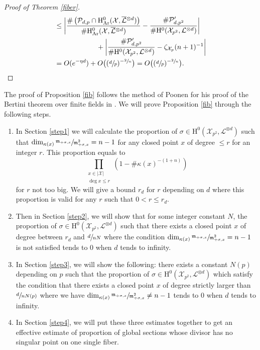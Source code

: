 \documentclass[JEP,XML,SOM,Unicode,published]{cedram}
\theoremstyle{plain}
\theoremstyle{definition}
\newcommand{\ho}{\mathrm{H}}
\newcommand{\m}{\mathfrak{m}}
\newcommand{\X}{\mathcal{X}}
\newcommand{\Li}{\overline{\mathcal{L}}{}}
\newcommand{\li}{\mathcal{L}}
\begin{document}
\begin{proof}[Proof of Theorem \ref{fiber}]
\begin{align*}
&\leq \biggl| \frac{\#\left(\mathcal{P}_{d,p}\cap \ho^0_{\mathrm{Ar}}(\X, \Li^{\otimes d})\right)}{\#\ho^0_{\mathrm{Ar}}(\X, \Li^{\otimes d})} -\frac{\#\mathcal{P}'_{d,p^2} }{\#\ho^0(\X_{p^2}, \li^{\otimes d})} \biggr|\\
&\hspace*{2.1cm}+\biggl| \frac{\#\mathcal{P}'_{d,p^2}}{\#\ho^0(\X_{p^2}, \li^{\otimes d})} -\zeta_{\X_p}(n+1)^{-1} \biggr| \\
&=O(e^{-\eta d})+O\bigl((\sfrac{d}{p})^{-\sfrac{2}{n}} \bigr)=O\bigl((\sfrac{d}{p})^{-\sfrac{2}{n}} \bigr).\qedhere
\end{align*}
\end{proof}

The proof of Proposition \ref{fib} follows the method of Poonen for his proof of the Bertini theorem over finite fields in \cite{Po04}.
We will prove Proposition \ref{fib} through the following steps.
\begin{enumerate}
\item In Section \ref{step1} we will calculate the proportion of $\sigma\in \ho^0(\X_{p^2}, \li^{\otimes d})$ such that $ \dim_{\kappa(x)}\sfrac{\m_{\div \sigma,x}}{\m^2_{\div \sigma, x}}=n-1$ for any closed point $x$ of degree $\leq r$ for an integer $r$. This proportion equals to
\[
\prod_{\substack{x\in |\X|\\ \deg x\leq r}}(1-\#\kappa(x)^{-(1+n)})
\]
for $r$ not too big. We will give a bound $r_d$ for $r$ depending on $d$ where this proportion is valid for any $r$ such that $0<r\leq r_d$.
\item Then in Section \ref{step2}, we will show that for some integer constant $N$, the proportion of $\sigma\in \ho^0(\X_{p^2}, \li^{\otimes d})$ such that there exists a closed point $x$ of degree between $r_d$ and $\sfrac{d}{nN}$ where the condition $ \dim_{\kappa(x)}\sfrac{\m_{\div \sigma,x}}{\m^2_{\div \sigma, x}}=n-1$ is not satisfied tends to $0$ when $d$ tends to infinity.
\item In Section \ref{step3}, we will show the following: there exists a constant $N(p)$ depending on $p$ such that the proportion of $\sigma\in \ho^0(\X_{p^2}, \li^{\otimes d})$ which satisfy the condition that there exists a closed point $x$ of degree strictly larger than $\sfrac{d}{nN(p)}$ where we have $ \dim_{\kappa(x)}\sfrac{\m_{\div \sigma,x}}{\m^2_{\div \sigma, x}}\not=n-1$ tends to $0$ when $d$ tends to infinity.
\item In Section \ref{step4}, we will put these three estimates together to get an effective estimate of proportion of global sections whose divisor has no singular point on one single fiber.
\end{enumerate}
\end{document}
